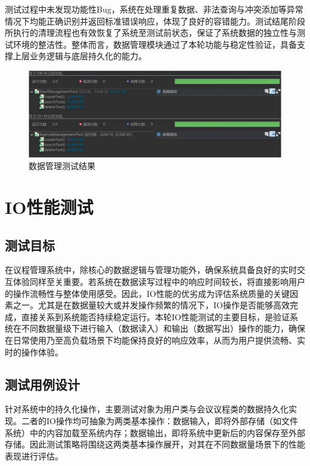 \documentclass[a4paper, twoside, utf8]{ctexart}
\begin{document}
    测试过程中未发现功能性Bug，系统在处理重复数据、非法查询与冲突添加等异常情况下均能正确识别并返回标准错误响应，体现了良好的容错能力。测试结尾阶段所执行的清理流程也有效恢复了系统至测试前状态，保证了系统数据的独立性与测试环境的整洁性。整体而言，数据管理模块通过了本轮功能与稳定性验证，具备支撑上层业务逻辑与底层持久化的能力。

    \begin{figure}[htbp]
        \centering
        \includegraphics[width=.9\linewidth]{figure/ManagementTest.png}
        \caption{数据管理测试结果}
    \end{figure}

    \section{IO性能测试}

    \subsection{测试目标}

    在议程管理系统中，除核心的数据逻辑与管理功能外，确保系统具备良好的实时交互体验同样至关重要。若系统在数据读写过程中的响应时间较长，将直接影响用户的操作流畅性与整体使用感受。因此，IO性能的优劣成为评估系统质量的关键因素之一。尤其是在数据量较大或并发操作频繁的情况下，IO操作是否能够高效完成，直接关系到系统能否持续稳定运行。本轮IO性能测试的主要目标，是验证系统在不同数据量级下进行输入（数据读入）和输出（数据写出）操作的能力，确保在日常使用乃至高负载场景下均能保持良好的响应效率，从而为用户提供流畅、实时的操作体验。
    
    \subsection{测试用例设计}

    针对系统中的持久化操作，主要测试对象为用户类与会议议程类的数据持久化实现。二者的IO操作均可抽象为两类基本操作：数据输入，即将外部存储（如文件系统）中的内容加载至系统内存；数据输出，即将系统中更新后的内容保存至外部存储。因此测试策略将围绕这两类基本操作展开，对其在不同数据量场景下的性能表现进行评估。
\end{document}
